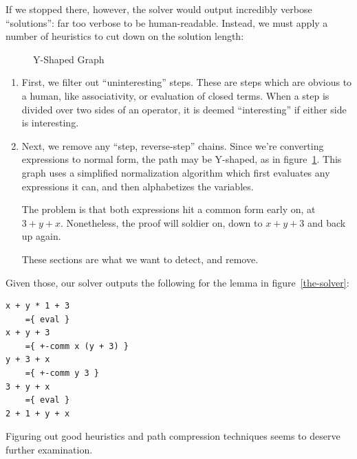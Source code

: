 \documentclass[acmsmall,review,anonymous]{acmart}\settopmatter{printfolios=true,printccs=false,printacmref=false}
\begin{document}
If we stopped there, however, the solver would output incredibly verbose
``solutions'': far too verbose to be human-readable. Instead, we must apply a
number of heuristics to cut down on the solution length:
\begin{figure}
  \centering
  \caption{Y-Shaped Graph}
  \label{y-graph}
\end{figure}
\begin{enumerate}
  \item First, we filter out ``uninteresting'' steps. These are steps which are
    obvious to a human, like associativity, or evaluation of closed terms. When
    a step is divided over two sides of an operator, it is deemed
    ``interesting'' if either side is interesting.
  \item Next, we remove any ``step, reverse-step'' chains. Since we're
    converting expressions to normal form, the path may be Y-shaped, as in
    figure~\ref{y-graph}. This graph uses a simplified normalization algorithm
    which first evaluates any expressions it can, and then alphabetizes the
    variables.

    The problem is that both expressions hit a common form early on, at \(3 + y
    + x\). Nonetheless, the proof will soldier on, down to \(x + y + 3\) and
    back up again.

    These sections are what we want to detect, and remove.
\end{enumerate}

Given those, our solver outputs the following for the lemma in
figure~\ref{the-solver}:
\begin{verbatim}
x + y * 1 + 3
    ={ eval }
x + y + 3
    ={ +-comm x (y + 3) }
y + 3 + x
    ={ +-comm y 3 }
3 + y + x
    ={ eval }
2 + 1 + y + x
\end{verbatim}
Figuring out good heuristics and path compression techniques seems to deserve
further examination.
\end{document}
